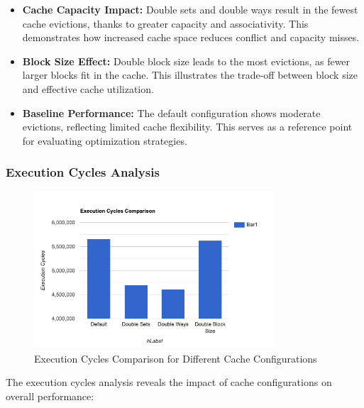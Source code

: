 \documentclass[10pt]{article}
\begin{document}
\begin{itemize}
    \item \textbf{Cache Capacity Impact:} Double sets and double ways result in the fewest cache evictions, thanks to greater capacity and associativity. This demonstrates how increased cache space reduces conflict and capacity misses.
    
    \item \textbf{Block Size Effect:} Double block size leads to the most evictions, as fewer larger blocks fit in the cache. This illustrates the trade-off between block size and effective cache utilization.
    
    \item \textbf{Baseline Performance:} The default configuration shows moderate evictions, reflecting limited cache flexibility. This serves as a reference point for evaluating optimization strategies.
\end{itemize}

\subsubsection{Execution Cycles Analysis}
\begin{figure}[H]
    \centering
    \includegraphics[width=0.8\textwidth]{./images/exec_cycles.png}
    \caption{Execution Cycles Comparison for Different Cache Configurations}
\end{figure}

The execution cycles analysis reveals the impact of cache configurations on overall performance:
\end{document}
